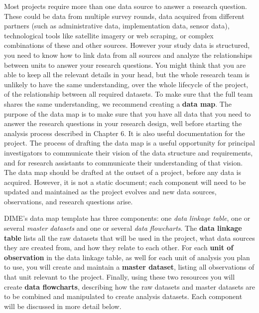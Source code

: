 Most projects require more than one data source to answer a research question.
These could be data from multiple survey rounds,
data acquired from different partners
(such as administrative data, implementation data, sensor data),
technological tools like satellite imagery or web scraping,
or complex combinations of these and other sources.
However your study data is structured,
you need to know how to link data from all sources
and analyze the relationships between units 
to answer your research questions.
You might think that you are able to keep all the relevant details in your head,
but the whole research team is unlikely to have the same understanding,
over the whole lifecycle of the project, of the relationship between all required datasets.
To make sure that the full team shares the same understanding,
we recommend creating a \textbf{data map}.
The purpose of the data map is to make sure that
you have all data that you need
to answer the research questions in your research design,
well before starting the analysis process described in Chapter 6.
It is also useful documentation for the project. 
The process of drafting the data map is a useful
opportunity for principal investigators
to communicate their vision of the data structure and requirements,
and for research assistants to communicate
their understanding of that vision.
The data map should be drafted at the outset of a project,
before any data is acquired.
However, it is not a static document;
each component will need to be updated
and maintained as the project evolves
and new data sources, observations, and research questions arise.

DIME's data map template has three components:
one \textit{data linkage table},
one or several \textit{master datasets}
and one or several \textit{data flowcharts}.
The \textbf{data linkage table}
lists all the raw datasets that will be used in the project,
what data sources they are created from,
and how they relate to each other.
For each \textbf{unit of observation}
in the data linkage table,
as well for each unit of analysis you plan to use,
you will create and maintain a \textbf{master dataset},
listing all observations of that unit relevant to the project.
Finally, using these two resources
you will  create \textbf{data flowcharts},
describing how the raw datasets and master datasets
are to be combined and manipulated to create analysis datasets.
Each component will be discussed in more detail below. 

